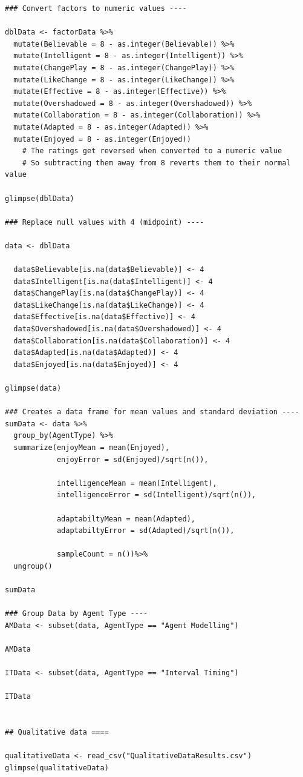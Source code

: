 \documentclass{IEEEtran}
\begin{document}
\begin{verbatim}
### Convert factors to numeric values ----

dblData <- factorData %>%
  mutate(Believable = 8 - as.integer(Believable)) %>%
  mutate(Intelligent = 8 - as.integer(Intelligent)) %>%
  mutate(ChangePlay = 8 - as.integer(ChangePlay)) %>%
  mutate(LikeChange = 8 - as.integer(LikeChange)) %>%
  mutate(Effective = 8 - as.integer(Effective)) %>%
  mutate(Overshadowed = 8 - as.integer(Overshadowed)) %>%
  mutate(Collaboration = 8 - as.integer(Collaboration)) %>%
  mutate(Adapted = 8 - as.integer(Adapted)) %>%
  mutate(Enjoyed = 8 - as.integer(Enjoyed))
    # The ratings get reversed when converted to a numeric value
    # So subtracting them away from 8 reverts them to their normal value

glimpse(dblData)

### Replace null values with 4 (midpoint) ----

data <- dblData

  data$Believable[is.na(data$Believable)] <- 4
  data$Intelligent[is.na(data$Intelligent)] <- 4
  data$ChangePlay[is.na(data$ChangePlay)] <- 4
  data$LikeChange[is.na(data$LikeChange)] <- 4
  data$Effective[is.na(data$Effective)] <- 4
  data$Overshadowed[is.na(data$Overshadowed)] <- 4
  data$Collaboration[is.na(data$Collaboration)] <- 4
  data$Adapted[is.na(data$Adapted)] <- 4
  data$Enjoyed[is.na(data$Enjoyed)] <- 4

glimpse(data)

### Creates a data frame for mean values and standard deviation ----
sumData <- data %>%
  group_by(AgentType) %>%
  summarize(enjoyMean = mean(Enjoyed),
            enjoyError = sd(Enjoyed)/sqrt(n()),
            
            intelligenceMean = mean(Intelligent),
            intelligenceError = sd(Intelligent)/sqrt(n()),
            
            adaptabiltyMean = mean(Adapted),
            adaptabiltyError = sd(Adapted)/sqrt(n()),
            
            sampleCount = n())%>%
  ungroup()

sumData

### Group Data by Agent Type ----
AMData <- subset(data, AgentType == "Agent Modelling")

AMData

ITData <- subset(data, AgentType == "Interval Timing")

ITData


## Qualitative data ====

qualitativeData <- read_csv("QualitativeDataResults.csv")
glimpse(qualitativeData)


\end{verbatim}
\end{document}
